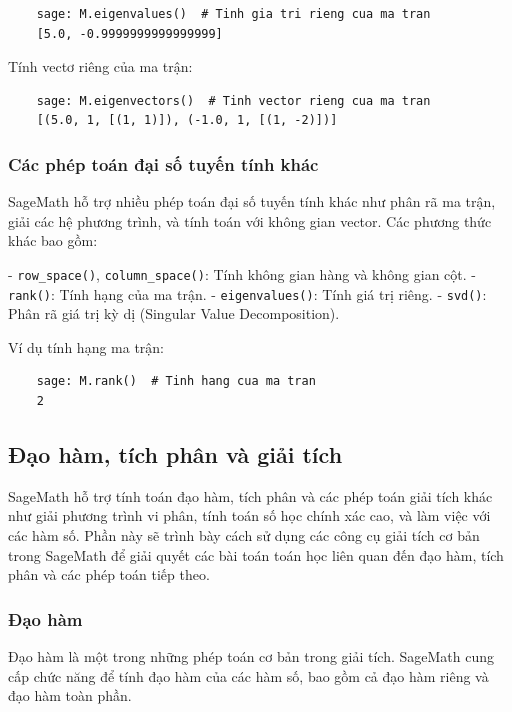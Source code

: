 \begin{lstlisting}
	sage: M.eigenvalues()  # Tinh gia tri rieng cua ma tran
	[5.0, -0.9999999999999999]
\end{lstlisting}

Tính vectơ riêng của ma trận:

\begin{lstlisting}
	sage: M.eigenvectors()  # Tinh vector rieng cua ma tran
	[(5.0, 1, [(1, 1)]), (-1.0, 1, [(1, -2)])]
\end{lstlisting}

\subsubsection{Các phép toán đại số tuyến tính khác}

SageMath hỗ trợ nhiều phép toán đại số tuyến tính khác như phân rã ma trận, giải các hệ phương trình, và tính toán với không gian vector. Các phương thức khác bao gồm:

- \texttt{row\_space()}, \texttt{column\_space()}: Tính không gian hàng và không gian cột.
- \texttt{rank()}: Tính hạng của ma trận.
- \texttt{eigenvalues()}: Tính giá trị riêng.
- \texttt{svd()}: Phân rã giá trị kỳ dị (Singular Value Decomposition).

Ví dụ tính hạng ma trận:

\begin{lstlisting}
	sage: M.rank()  # Tinh hang cua ma tran
	2
\end{lstlisting}

\subsection{Đạo hàm, tích phân và giải tích}

SageMath hỗ trợ tính toán đạo hàm, tích phân và các phép toán giải tích khác như giải phương trình vi phân, tính toán số học chính xác cao, và làm việc với các hàm số. Phần này sẽ trình bày cách sử dụng các công cụ giải tích cơ bản trong SageMath để giải quyết các bài toán toán học liên quan đến đạo hàm, tích phân và các phép toán tiếp theo.

\subsubsection{Đạo hàm}

Đạo hàm là một trong những phép toán cơ bản trong giải tích. SageMath cung cấp chức năng để tính đạo hàm của các hàm số, bao gồm cả đạo hàm riêng và đạo hàm toàn phần.

